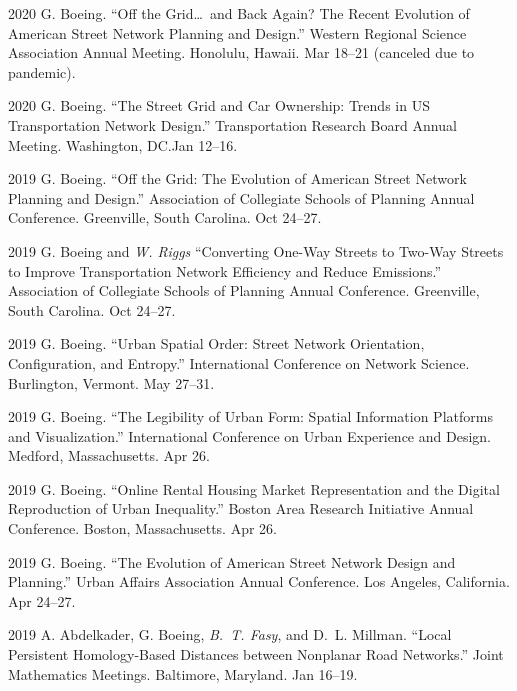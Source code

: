 \documentclass[12pt,letterpaper]{report}
\begin{document}
\begin{tablist}
        \item[2020] \tab{}G. Boeing. \enquote{Off the Grid\ldots\ and Back Again? The Recent Evolution of American Street Network Planning and Design.} Western Regional Science Association Annual Meeting. Honolulu, Hawaii. Mar 18--21 (canceled due to pandemic).

        \item[2020] \tab{}G. Boeing. \enquote{The Street Grid and Car Ownership: Trends in US Transportation Network Design.} Transportation Research Board Annual Meeting. Washington, DC.\@ Jan 12--16.

        \item[2019] \tab{}G. Boeing. \enquote{Off the Grid: The Evolution of American Street Network Planning and Design.} Association of Collegiate Schools of Planning Annual Conference. Greenville, South Carolina. Oct 24--27.

        \item[2019] \tab{}G. Boeing and \textit{W. Riggs} \enquote{Converting One-Way Streets to Two-Way Streets to Improve Transportation Network Efficiency and Reduce Emissions.} Association of Collegiate Schools of Planning Annual Conference. Greenville, South Carolina. Oct 24--27.

        \item[2019] \tab{}G. Boeing. \enquote{Urban Spatial Order: Street Network Orientation, Configuration, and Entropy.} International Conference on Network Science. Burlington, Vermont. May 27--31.

        \item[2019] \tab{}G. Boeing. \enquote{The Legibility of Urban Form: Spatial Information Platforms and Visualization.} International Conference on Urban Experience and Design. Medford, Massachusetts. Apr 26.

        \item[2019] \tab{}G. Boeing. \enquote{Online Rental Housing Market Representation and the Digital Reproduction of Urban Inequality.} Boston Area Research Initiative Annual Conference. Boston, Massachusetts. Apr 26.

        \item[2019] \tab{}G. Boeing. \enquote{The Evolution of American Street Network Design and Planning.} Urban Affairs Association Annual Conference. Los Angeles, California. Apr 24--27.

        \item[2019] \tab{}A. Abdelkader, G. Boeing, \textit{B.~T. Fasy}, and D.~L. Millman. \enquote{Local Persistent Homology-Based Distances between Nonplanar Road Networks.} Joint Mathematics Meetings. Baltimore, Maryland. Jan 16--19.


\end{tablist}
\end{document}
